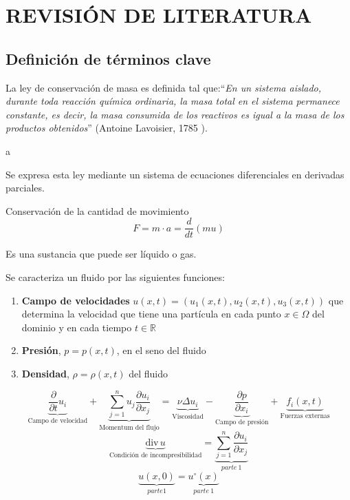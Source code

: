 \chapter{REVISIÓN DE LITERATURA}
\section{Definición de términos clave}
La ley de conservación de masa es definida tal que:``\textit{En un sistema aislado, durante toda reacción química ordinaria, la masa total en el sistema permanece constante, es decir, la masa consumida de los reactivos es igual a la masa de los productos obtenidos}'' (Antoine Lavoisier, 1785 \cite{sterner2011conservation}).
\begin{definition}
    a
\end{definition}
Se expresa esta ley mediante un sistema de ecuaciones diferenciales en derivadas parciales.

Conservación de la cantidad de movimiento
\begin{equation}
    F = m \cdot a = \frac{d}{dt}(mu)
\end{equation}
\begin{definition}[Fluido]
    Es una sustancia que puede ser líquido o gas.
\end{definition}
Se caracteriza un fluido por las siguientes funciones:
\begin{enumerate}
    \item \textbf{Campo de velocidades} $u(x,t) = \left(u_1(x,t),u_2(x,t),u_3(x,t)\right)$ que determina la velocidad que tiene una partícula en cada punto $x\in\Omega$ del dominio y en cada tiempo $t\in \mathbb{R}$
    \item \textbf{Presión}, $p=p(x,t)$, en el seno del fluido
    \item \textbf{Densidad}, $\rho= \rho(x,t)$ del fluido
\end{enumerate}
\begin{equation}
    \underbrace{\frac{\partial}{\partial t} u_i}_{\text{Campo de velocidad}} + \underbrace{\sum_{j = 1}^n u_j \frac{\partial u_i}{\partial x_j}}_{\text{Momentum del flujo}} = \underbrace{\nu \Delta u_i}_{\text{Viscosidad}} - \underbrace{ \frac{\partial p}{\partial x_i}}_{\text{Campo de presión}}+ \underbrace{f_i(x,t)}_{\text{Fuerzas externas}} 
\end{equation}
\begin{equation}
    \underbrace{\text{div}\, u}_{\text{Condición de incompresibilidad}} = \underbrace{\sum_{j = 1}^n \frac{\partial u_i}{\partial x_j}}_{parte\ 1} 
\end{equation}
\begin{equation}
    \underbrace{u(x,0)}_{parte 1} = \underbrace{u^{\circ}(x)}_{parte\ 1} 
\end{equation}

